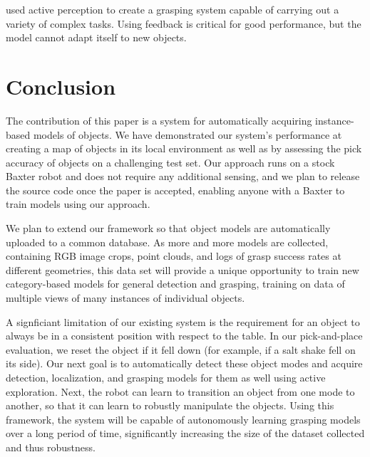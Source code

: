 \documentclass[graybox]{svmult}
\begin{document}
\citet{hudson12} used active perception to create a grasping system
capable of carrying out a variety of complex tasks.  Using feedback is
critical for good performance, but the model cannot adapt itself to
new objects.

\section{Conclusion}

The contribution of this paper is a system for automatically acquiring
instance-based models of objects.  We have demonstrated our system's
performance at creating a map of objects in its local environment as
well as by assessing the pick accuracy of objects on a challenging
test set.  Our approach runs on a stock Baxter robot and does not
require any additional sensing, and we plan to release the source code
once the paper is accepted, enabling anyone with a Baxter to train
models using our approach.

We plan to extend our framework so that object models are
automatically uploaded to a common database.  As more and more models
are collected, containing RGB image crops, point clouds, and logs of
grasp success rates at different geometries, this data set will
provide a unique opportunity to train new category-based models for
general detection and grasping, training on data of multiple views of
many instances of individual objects.

A signficiant limitation of our existing system is the requirement for
an object to always be in a consistent position with respect to the
table.  In our pick-and-place evaluation, we reset the object if it
fell down (for example, if a salt shake fell on its side).  Our next
goal is to automatically detect these object modes and acquire
detection, localization, and grasping models for them as well using
active exploration.  Next, the robot can learn to transition an object
from one mode to another, so that it can learn to robustly manipulate
the objects.  Using this framework, the system will be capable of
autonomously learning grasping models over a long period of time,
significantly increasing the size of the dataset collected and thus
robustness.



\end{document}
